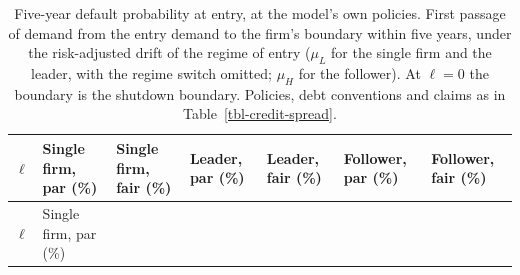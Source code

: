 \documentclass[
  11pt,
  letterpaper,
]{scrartcl}
\begin{document}
\begin{longtable}[]{@{}
  >{\raggedleft\arraybackslash}p{}
  >{\raggedleft\arraybackslash}p{}
  >{\raggedleft\arraybackslash}p{}
  >{\raggedleft\arraybackslash}p{}
  >{\raggedleft\arraybackslash}p{}
  >{\raggedleft\arraybackslash}p{}
  >{\raggedleft\arraybackslash}p{}@{}}
\caption{Five-year default probability at entry, at the model's own
policies. First passage of demand from the entry demand to the firm's
boundary within five years, under the risk-adjusted drift of the regime
of entry (\(\mu_L\) for the single firm and the leader, with the regime
switch omitted; \(\mu_H\) for the follower). At \(\ell = 0\) the
boundary is the shutdown boundary. Policies, debt conventions and claims
as in
Table~\ref{tbl-credit-spread}.}\label{tbl-credit-pd}\tabularnewline
\toprule\noalign{}
\begin{minipage}[b]{\linewidth}\raggedleft
\(\ell\)
\end{minipage} & \begin{minipage}[b]{\linewidth}\raggedleft
Single firm, par (\%)
\end{minipage} & \begin{minipage}[b]{\linewidth}\raggedleft
Single firm, fair (\%)
\end{minipage} & \begin{minipage}[b]{\linewidth}\raggedleft
Leader, par (\%)
\end{minipage} & \begin{minipage}[b]{\linewidth}\raggedleft
Leader, fair (\%)
\end{minipage} & \begin{minipage}[b]{\linewidth}\raggedleft
Follower, par (\%)
\end{minipage} & \begin{minipage}[b]{\linewidth}\raggedleft
Follower, fair (\%)
\end{minipage} \\
\midrule\noalign{}
\endfirsthead
\toprule\noalign{}
\begin{minipage}[b]{\linewidth}\raggedleft
\(\ell\)
\end{minipage} & \begin{minipage}[b]{\linewidth}\raggedleft
Single firm, par (\%)
\end{minipage} & \begin{minipage}[b]{\linewidth}\raggedleft

\end{minipage}
\end{longtable}
\end{document}
